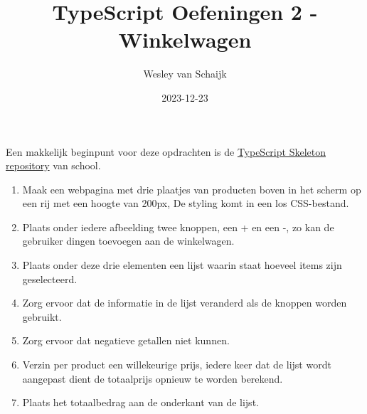 \documentclass{article}
\title{TypeScript Oefeningen 2 - Winkelwagen}
\author{Wesley van Schaijk}
\date{2023-12-23}
\begin{document}
\maketitle

\paragraph{}
Een makkelijk beginpunt voor deze opdrachten is de \href{https://github.com/HZ-HBO-ICT/ts-skeleton-app}{TypeScript Skeleton repository} van school.

\begin{enumerate}
	\item Maak een webpagina met drie plaatjes van producten boven in het scherm op een rij met een hoogte van 200px, De styling komt in een los CSS-bestand.
	\item Plaats onder iedere afbeelding twee knoppen, een + en een -, zo kan de gebruiker dingen toevoegen aan de winkelwagen.
	\item Plaats onder deze drie elementen een lijst waarin staat hoeveel items zijn geselecteerd.
	\item Zorg ervoor dat de informatie in de lijst veranderd als de knoppen worden gebruikt.
	\item Zorg ervoor dat negatieve getallen niet kunnen.
	\item Verzin per product een willekeurige prijs, iedere keer dat de lijst wordt aangepast dient de totaalprijs opnieuw te worden berekend.
	\item Plaats het totaalbedrag aan de onderkant van de lijst.
\end{enumerate}
\end{document}
